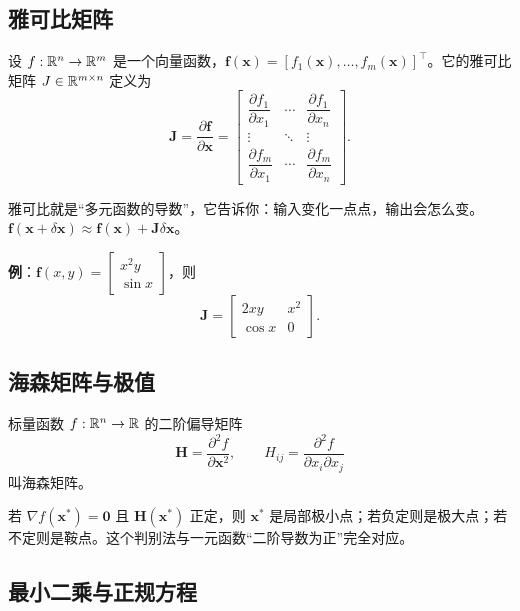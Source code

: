 \subsection{雅可比矩阵}

\begin{definition}[雅可比矩阵]
设 $f:\mathbb{R}^{n}\to\mathbb{R}^{m}$ 是一个向量函数，$\bm{f}(\bm{x})=[f_1(\bm{x}),\dots,f_m(\bm{x})]^{\top}$。它的雅可比矩阵 $J\in\mathbb{R}^{m\times n}$ 定义为
\begin{equation}
\bm{J}=\frac{\partial\bm{f}}{\partial\bm{x}}=
\begin{bmatrix}
\dfrac{\partial f_1}{\partial x_1}&\cdots&\dfrac{\partial f_1}{\partial x_n}\\
\vdots&\ddots&\vdots\\
\dfrac{\partial f_m}{\partial x_1}&\cdots&\dfrac{\partial f_m}{\partial x_n}
\end{bmatrix}.
\end{equation}
\end{definition}
雅可比就是“多元函数的导数”，它告诉你：输入变化一点点，输出会怎么变。$\bm{f}(\bm{x}+\delta\bm{x})\approx\bm{f}(\bm{x})+\bm{J}\delta\bm{x}$。

\textbf{例}：$\bm{f}(x,y)=\begin{bmatrix}x^{2}y\\ \sin x\end{bmatrix}$，则
\begin{equation}
\bm{J}=\begin{bmatrix}2xy&x^{2}\\ \cos x&0\end{bmatrix}.
\end{equation}

\subsection{海森矩阵与极值}

\begin{definition}[海森矩阵]
标量函数 $f:\mathbb{R}^{n}\to\mathbb{R}$ 的二阶偏导矩阵
\begin{equation}
\bm{H}=\frac{\partial^{2}f}{\partial\bm{x}^{2}},\qquad H_{ij}=\frac{\partial^{2}f}{\partial x_i\partial x_j}
\end{equation}
叫海森矩阵。
\end{definition}
若 $\nabla f(\bm{x}^{*})=\bm{0}$ 且 $\bm{H}(\bm{x}^{*})$ 正定，则 $\bm{x}^{*}$ 是局部极小点；若负定则是极大点；若不定则是鞍点。这个判别法与一元函数“二阶导数为正”完全对应。

\subsection{最小二乘与正规方程}

